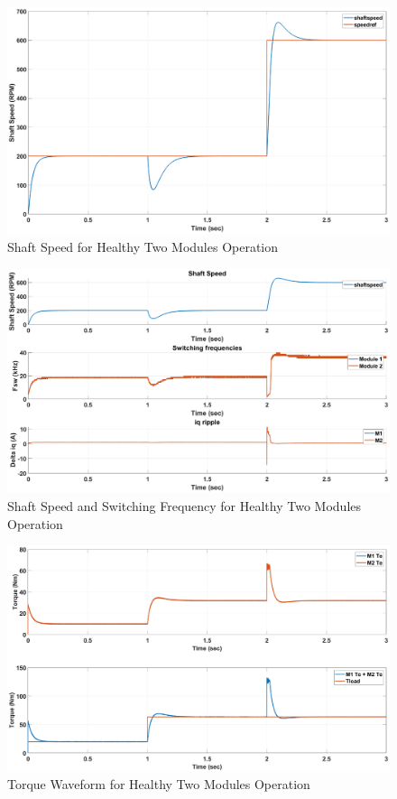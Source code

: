 \documentclass{article}
\begin{document}
\begin{figure}[h!]
\centering
\includegraphics[scale=0.35]{SimulationResults/two_modules/healthy/speed.eps}
\caption{Shaft Speed for Healthy Two Modules Operation}
\label{fig:ShaftSpeedTwoModulesHealthy}
\end{figure}

\begin{figure}[h!]
\centering
\includegraphics[scale=0.35]{SimulationResults/two_modules/healthy/speed_fsw_iqripple.eps}
\caption{Shaft Speed and Switching Frequency for Healthy Two Modules Operation}
\label{fig:ShaftSpeedFswIqRippleTwoModulesHealthy}
\end{figure}

\begin{figure}[h!]
\centering
\includegraphics[scale=0.35]{SimulationResults/two_modules/healthy/tref_tload.eps}
\caption{Torque Waveform for Healthy Two Modules Operation}
\label{fig:TorqueTwoModulesHealthy}
\end{figure}
\end{document}
